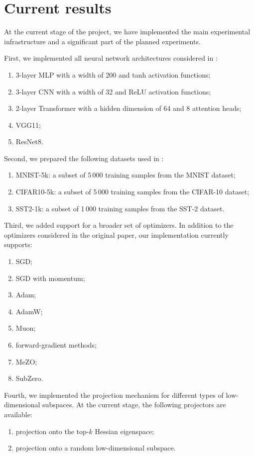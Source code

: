 \documentclass[conference]{IEEEtran}
\begin{document}
\section{Current results}

At the current stage of the project, we have implemented the main experimental infrastructure and a significant part of the planned experiments.

First, we implemented all neural network architectures considered in \citet{SongDoesSGD}:
\begin{enumerate}
    \item 3-layer MLP with a width of 200 and tanh activation functions;
    \item 3-layer CNN with a width of 32 and ReLU activation functions;
    \item 2-layer Transformer with a hidden dimension of 64 and 8 attention
heads;
    \item VGG11;
    \item ResNet8.
\end{enumerate}
Second, we prepared the following datasets used in \citet{SongDoesSGD}:
\begin{enumerate}
    \item MNIST-5k: a subset of 5\,000 training samples from the MNIST dataset;
    \item CIFAR10-5k: a subset of 5\,000 training samples from the CIFAR-10 dataset;
    \item SST2-1k: a subset of 1\,000 training samples from the SST-2 dataset.
\end{enumerate}

Third, we added support for a broader set of optimizers. In addition to the optimizers considered in the original paper, our implementation currently supports:
\begin{enumerate}
    \item SGD;
    \item SGD with momentum;
    \item Adam;
    \item AdamW;
    \item Muon;
    \item forward-gradient methods;
    \item MeZO;
    \item SubZero.
\end{enumerate}

Fourth, we implemented the projection mechanism for different types of low-dimensional subspaces. At the current stage, the following projectors are available:
\begin{enumerate}
    \item projection onto the top-$k$ Hessian eigenspace;
    \item projection onto a random low-dimensional subspace.
\end{enumerate}
\end{document}
